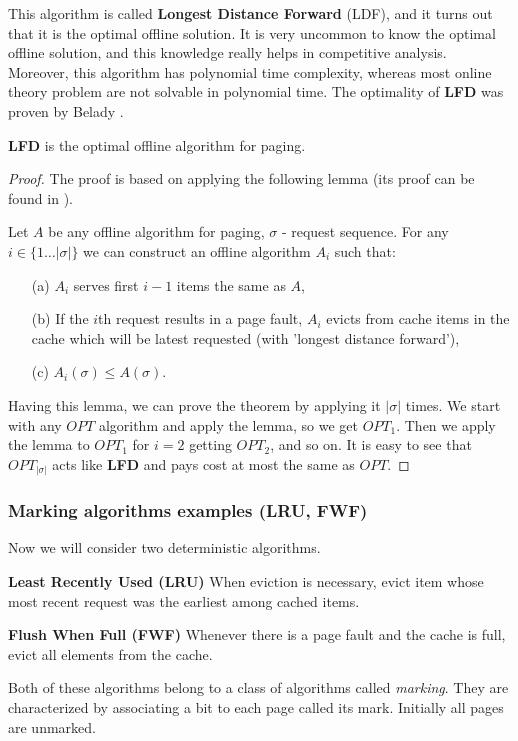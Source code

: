 This algorithm is called \textbf{Longest Distance Forward} (LDF), and it turns 
out that it is the optimal offline solution. It is very uncommon to know the 
optimal offline solution, and this knowledge really helps in competitive analysis.
Moreover, this algorithm has polynomial 
time complexity, whereas most online theory problem are not solvable in 
polynomial time. The optimality of \textbf{LFD} was proven by Belady 
\cite{LFDBelady}.
\begin{theorem} 
 \textbf{LFD} is the optimal offline algorithm for paging.
\end{theorem}
\begin{proof}
 The proof is based on applying the following lemma (its proof can be found in 
\cite{czarodziej}).
\begin{lemma}
Let $A$ be any offline algorithm for paging, $\sigma$ - request sequence. For 
any $i \in \{1 \ldots |\sigma|\}$ we can construct an offline algorithm $A_i$ such 
that:
\begin{itemize}
 \item[(a)] $A_i$ serves first $i-1$ items the same as $A$,
 \item[(b)] If the $i$th request results in a page fault, $A_i$ evicts from cache 
items in the cache which will be latest requested (with 'longest distance 
forward'),
  \item[(c)] $A_i(\sigma) \leq A(\sigma)$.
\end{itemize}
\end{lemma}
Having this lemma, we can prove the theorem by applying it $|\sigma|$ times. 
We start with any $OPT$ algorithm and apply the lemma, so we get $OPT_1$. Then 
we apply the lemma to $OPT_1$ for $i=2$ getting $OPT_2$, and so on. It is easy to 
see that $OPT_{|\sigma|}$ acts like \textbf{LFD} and pays cost at most the 
same 
as $OPT$.
\end{proof}

\subsubsection{Marking algorithms examples (LRU, FWF)}
Now we will consider two deterministic algorithms.
\begin{myalgo}
 \textbf{Least Recently Used (LRU)}
 \newline
When eviction is necessary, evict item whose most recent request was the 
earliest among cached items.
\end{myalgo}
\begin{myalgo}
  \textbf{Flush When Full (FWF)}
  \newline
Whenever there is a page fault and the cache is full, evict all elements from the cache.
\end{myalgo}
Both of these algorithms belong to a class of algorithms called \textit{marking}. 
They are characterized by associating a bit to each page called
its mark. Initially all pages are unmarked. 

